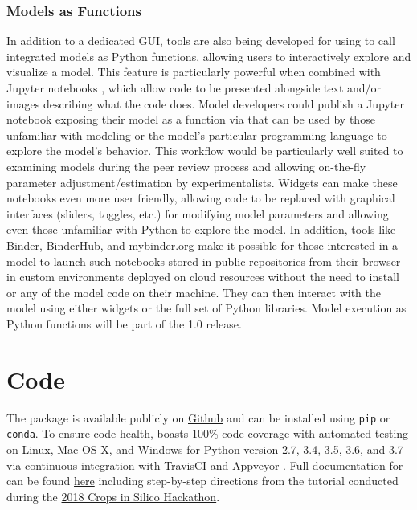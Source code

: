 \documentclass[journal]{IEEEtran}
\newcommand{\todo}[1]{{\color{red}{#1}}}
\newcommand{\pkg}{{\tt \todo{cis\_interface}}{}}
\begin{document}
\subsubsection{Models as Functions}\label{SS:function}
%
In addition to a dedicated GUI, tools are also being developed for using {\pkg} to call integrated models as Python functions, allowing users to interactively explore and visualize a model. This feature is particularly powerful when combined with Jupyter notebooks \citep{Kluyver2016}, which allow code to be presented alongside text and/or images describing what the code does. Model developers could publish a Jupyter notebook exposing their model as a function via {\pkg} that can be used by those unfamiliar with modeling or the model's particular programming language to explore the model's behavior. This workflow would be particularly well suited to examining models during the peer review process and allowing on-the-fly parameter adjustment/estimation by experimentalists. Widgets can make these notebooks even more user friendly, allowing code to be replaced with graphical interfaces (sliders, toggles, etc.) for modifying model parameters and allowing even those unfamiliar with Python to explore the model. In addition, tools like Binder, BinderHub, and mybinder.org \citep{Jupyter2018} make it possible for those interested in a model to launch such notebooks stored in public repositories from their browser in custom environments deployed on cloud resources without the need to install {\pkg} or any of the model code on their machine. They can then interact with the model using either widgets or the full set of Python libraries.
Model execution as Python functions will be part of the {\pkg} 1.0 release.

\section*{Code}\label{S:code}
The {\pkg} package is available publicly on \href{https://github.com/cropsinsilico/cis_interface}{Github} and can be 
installed using {\tt pip} or {\tt conda}. To ensure code health, {\pkg} boasts 100\% code coverage with automated testing on Linux, Mac OS X, and Windows for Python version 2.7, 3.4, 3.5, 3.6, and 3.7 via continuous integration with TravisCI \citep{travisci} and Appveyor \citep{appveyor}. Full documentation for {\pkg} can be found \href{https://cropsinsilico.github.io/cis_interface/}{here} including step-by-step directions from the tutorial conducted during the \href{https://cropsinsilico.github.io/cis_interface/hackathon2018/index.html}{2018 Crops in Silico Hackathon}.
\end{document}

